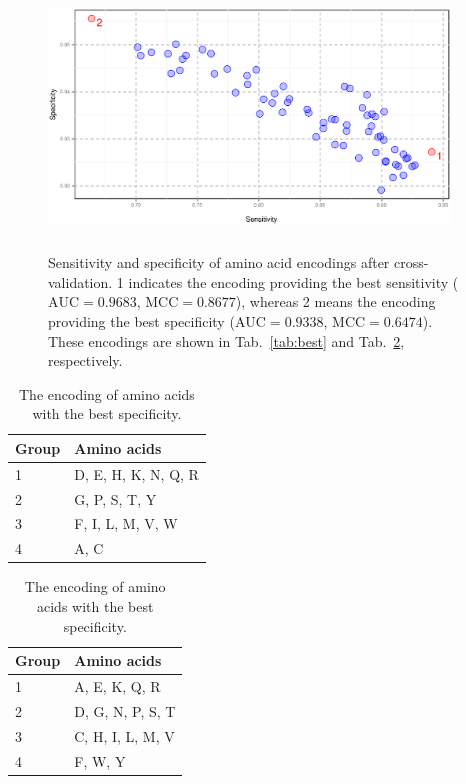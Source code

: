 \documentclass[10pt,letterpaper]{article}
\begin{document}
\begin{figure}[ht]\centering
\includegraphics[width=0.95\textwidth, height=7cm]{figures/cvres.eps}
\caption{Sensitivity and specificity of amino acid encodings after cross-validation. 1 indicates the encoding providing the best sensitivity ($\textrm{AUC} = 0.9683$, $\textrm{MCC} = 0.8677$), whereas 2 means the encoding providing the best specificity ($\textrm{AUC} = 0.9338$, $\textrm{MCC} = 0.6474$). These encodings are shown in Tab.~\ref{tab:best} and Tab.~\ref{tab:worst}, respectively.}
\label{fig:cvres}
\end{figure}

\begin{table}[ht]
\begin{minipage}{.5\linewidth} 
\centering
\caption{The encoding of amino acids with the best sensitivity.} 
\begin{tabular}{ll}
  \toprule
Group & Amino acids \\ 
  \midrule
1 & D, E, H, K, N, Q, R \\ 
   \rowcolor[gray]{0.85}2 & G, P, S, T, Y \\ 
  3 & F, I, L, M, V, W \\ 
   \rowcolor[gray]{0.85} 4 & A, C \\ 
   \bottomrule
\end{tabular}
\label{tab:best}

\end{minipage}
\begin{minipage}{.5\linewidth}
\centering
\caption{The encoding of amino acids with the best specificity.} 
\begin{tabular}{ll}
  \toprule
Group & Amino acids\\ 
  \midrule
1 & A, E, K, Q, R\\ 
   \rowcolor[gray]{0.85} 2 & D, G, N, P, S, T\\ 
  3 & C, H, I, L, M, V\\ 
   \rowcolor[gray]{0.85} 4 & F, W, Y\\ 
   \bottomrule
\end{tabular}
\label{tab:worst}
\end{minipage}
\end{table}
\end{document}
